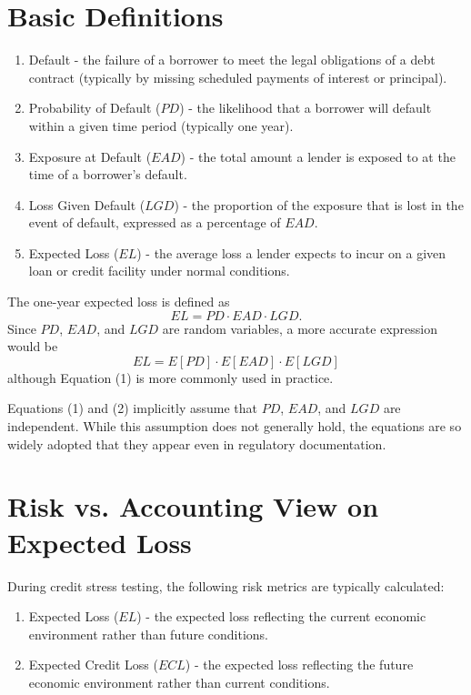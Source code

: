 \documentclass[11pt,a4paper]{article}
\begin{document}
\section{Basic Definitions}

\begin{enumerate}
\item Default - the failure of a borrower to meet the legal obligations of a debt contract (typically by missing scheduled payments of interest or principal).
\item Probability of Default ($PD$) - the likelihood that a borrower will default within a given time period (typically one year).
\item Exposure at Default ($EAD$) - the total amount a lender is exposed to at the time of a borrower’s default.
\item Loss Given Default ($LGD$) - the proportion of the exposure that is lost in the event of default, expressed as a percentage of $EAD$.
\item Expected Loss ($EL$) - the average loss a lender expects to incur on a given loan or credit facility under normal conditions.
\end{enumerate}

The one-year expected loss is defined as
\begin{equation}
EL = PD \cdot EAD \cdot LGD.
\end{equation}
Since $PD$, $EAD$, and $LGD$ are random variables, a more accurate expression would be
\begin{equation}
EL = E[PD] \cdot E[EAD] \cdot E[LGD]
\end{equation}
although Equation (1) is more commonly used in practice.

Equations (1) and (2) implicitly assume that $PD$, $EAD$, and $LGD$ are independent. While this assumption does not generally hold, the equations are so widely adopted that they appear even in regulatory documentation.

\section{Risk vs. Accounting View on Expected Loss}

During credit stress testing, the following risk metrics are typically calculated:
\begin{enumerate}
\item Expected Loss ($EL$) - the expected loss reflecting the current economic environment rather than future conditions.
\item Expected Credit Loss ($ECL$) - the expected loss reflecting the future economic environment rather than current conditions.
\end{enumerate}
\end{document}
